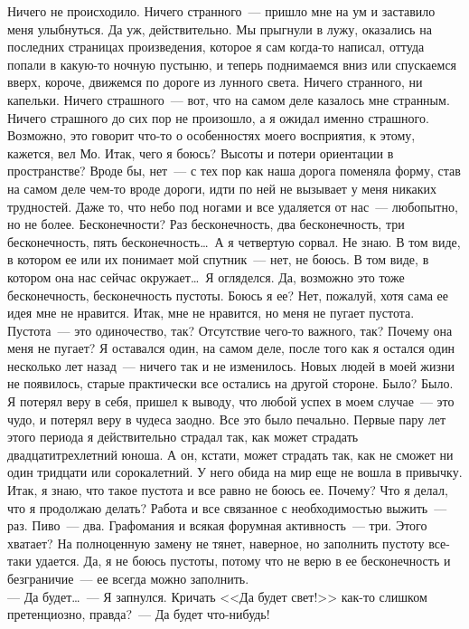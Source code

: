 Ничего не происходило. Ничего странного~--- пришло мне на ум и заставило меня 
улыбнуться. Да уж, действительно. Мы прыгнули в лужу, оказались на последних 
страницах произведения, которое я сам когда-то написал, оттуда попали в 
какую-то 
ночную пустыню, и теперь поднимаемся вниз или спускаемся вверх, короче, 
движемся 
по дороге из лунного света. Ничего странного, ни капельки. Ничего страшного~--- 
вот, что на самом деле казалось мне странным. Ничего страшного до сих пор не 
произошло, а я ожидал именно страшного. Возможно, это говорит что-то о 
особенностях моего восприятия, к этому, кажется, вел Мо. Итак, чего я боюсь? 
Высоты и потери ориентации в пространстве? Вроде бы, нет~--- с тех пор как наша 
дорога поменяла форму, став на самом деле чем-то вроде дороги, идти по ней не 
вызывает у меня никаких трудностей. Даже то, что небо под ногами и все 
удаляется 
от нас~--- любопытно, но не более. Бесконечности? Раз бесконечность, два 
бесконечность, три бесконечность, пять бесконечность\ldots\ А я четвертую 
сорвал. Не 
знаю. В том виде, в котором ее или их понимает мой спутник~--- нет, не боюсь. В 
том виде, в котором она нас сейчас окружает\ldots\ Я огляделся. Да, возможно 
это 
тоже бесконечность, бесконечность пустоты. Боюсь я ее? Нет, пожалуй, хотя сама 
ее идея мне не нравится. Итак, мне не нравится, но меня не пугает пустота. 
Пустота~--- это одиночество, так? Отсутствие чего-то важного, так? Почему она 
меня 
не пугает? Я оставался один, на самом деле, после того как я остался один 
несколько лет назад~--- ничего так и не изменилось. Новых людей в моей жизни не 
появилось, старые практически все остались на другой стороне. Было? Было. Я 
потерял веру в себя, пришел к выводу, что любой успех в моем случае~--- это 
чудо, 
и потерял веру в чудеса заодно. Все это было печально. Первые пару лет этого 
периода я действительно страдал так, как может страдать двадцатитрехлетний 
юноша. А он, кстати, может страдать так, как не сможет ни один тридцати или 
сорокалетний. У него обида на мир еще не вошла в привычку. Итак, я знаю, что 
такое пустота и все равно не боюсь ее. Почему? Что я делал, что я продолжаю 
делать? Работа и все связанное с необходимостью выжить~--- раз. Пиво~--- два. 
Графомания и всякая форумная активность~--- три. Этого хватает? На полноценную 
замену не тянет, наверное, но заполнить пустоту все-таки удается. Да, я не 
боюсь пустоты, потому что не верю в ее бесконечность и безграничие~--- ее всегда 
можно заполнить.\\
--- Да будет\ldots~--- Я запнулся. Кричать <<Да будет свет!>> как-то слишком 
претенциозно, правда?~--- Да будет что-нибудь!

